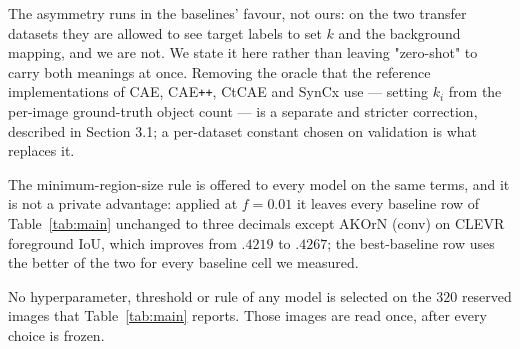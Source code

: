 The asymmetry runs in the baselines' favour, not ours: on the two transfer datasets they are
allowed to see target labels to set $k$ and the background mapping, and we are not. We state it
here rather than leaving "zero-shot" to carry both meanings at once. Removing the oracle that the
reference implementations of CAE, CAE\texttt{++}, CtCAE and SynCx use --- setting $k_i$ from the
per-image ground-truth object count --- is a separate and stricter correction, described in
Section 3.1; a per-dataset constant chosen on validation is what replaces it.

The minimum-region-size rule is offered to every model on the same terms, and it is not a private
advantage: applied at $f=0.01$ it leaves every baseline row of Table~\ref{tab:main} unchanged to
three decimals except AKOrN (conv) on CLEVR foreground IoU, which improves from $.4219$ to
$.4267$; the best-baseline row uses the better of the two for every baseline cell we measured.

No hyperparameter, threshold or rule of any model is selected on the $320$ reserved images that
Table~\ref{tab:main} reports. Those images are read once, after every choice is frozen.
